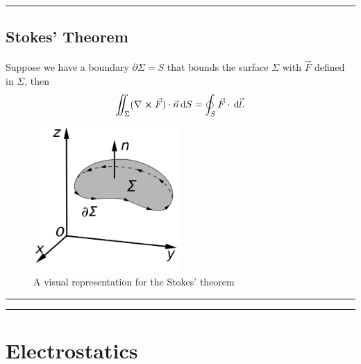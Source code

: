 \documentclass[a4paper]{article}
\newcommand{\dmr}[1]{\, \mathrm{d}#1} %
\numberwithin{equation}{subsection}
\begin{document}
\par\noindent\rule{\textwidth}{0.4pt}

\subsection{Stokes' Theorem}
Suppose we have a boundary $\partial \Sigma = S$ that bounds the surface $\Sigma$ with $\vec{F}$ defined in $\Sigma$, then
\[
    \iint_{\Sigma} (\nabla \cross \vec{F})\cdot\vec{n}\dmr{S} = \oint_{S} \vec{F}\cdot \dmr{\vec{l}}.
\] 
\begin{figure}[h]
    \centering
    \includegraphics[width =0.5\textwidth]{1200px-Stokes'_Theorem.svg.png}
    \caption{A visual representation for the Stokes' theorem\cite{noauthor_stokes_2021}}
\end{figure}

\par\noindent\rule{\textwidth}{0.4pt}
\par\noindent\rule{\textwidth}{0.4pt}
\section{Electrostatics}
\end{document}

